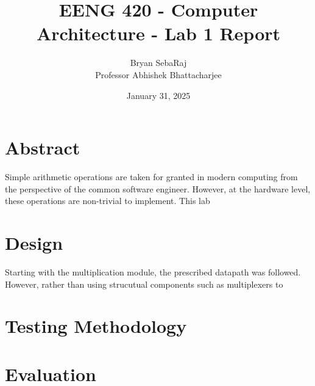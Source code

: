 \documentclass[12pt]{article}
\title{EENG 420 - Computer Architecture - Lab 1 Report}
\author{Bryan SebaRaj \\[0.5em] Professor Abhishek Bhattacharjee}
\date{January 31, 2025}
\begin{document}
\maketitle

%
%

\section*{Abstract}

Simple arithmetic operations are taken for granted in modern computing from the
perspective of the common software engineer. However, at the hardware level,
these operations are non-trivial to implement. This lab 


\section*{Design}

Starting with the multiplication module, the prescribed datapath was followed.
However, rather than using strucutual components such as multiplexers to 


\section*{Testing Methodology}


\section*{Evaluation}
\end{document}
